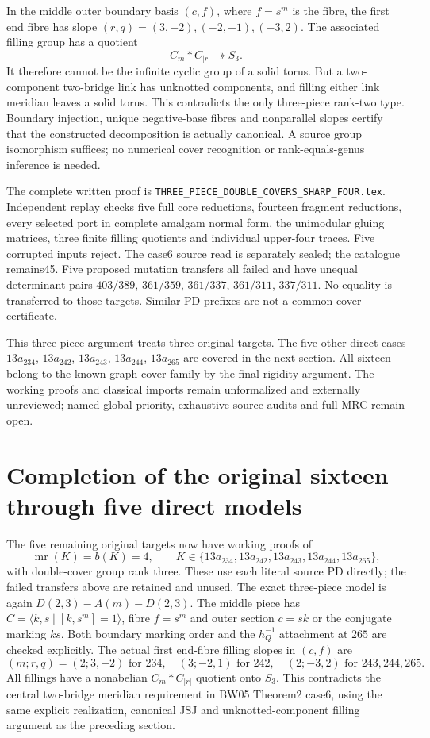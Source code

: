 \documentclass[11pt]{article}
\newcommand{\mr}{\operatorname{mr}}
\begin{document}
In the middle outer boundary basis $(c,f)$, where $f=s^m$ is the fibre,
the first end fibre has slope $(r,q)=(3,-2),(-2,-1),(-3,2)$.
The associated filling group has a quotient
\[
 C_m*C_{|r|}\twoheadrightarrow S_3.
\]
It therefore cannot be the infinite cyclic group of a solid torus.
But a two-component two-bridge link has unknotted components, and filling
either link meridian leaves a solid torus. This contradicts the only
three-piece rank-two type. Boundary injection, unique negative-base
fibres and nonparallel slopes certify that the constructed decomposition
is actually canonical. A source group isomorphism suffices; no numerical
cover recognition or rank-equals-genus inference is needed.

The complete written proof is
\texttt{THREE\_PIECE\_DOUBLE\_COVERS\_SHARP\_FOUR.tex}.
Independent replay checks five full core reductions, fourteen fragment
reductions, every selected port in complete amalgam normal form, the
unimodular gluing matrices, three finite filling quotients and individual
upper-four traces. Five corrupted inputs reject. The case6 source read
is separately sealed; the catalogue remains45.
Five proposed mutation transfers all failed and have unequal determinant
pairs $403/389$, $361/359$, $361/337$, $361/311$, $337/311$.
No equality is transferred to those targets. Similar PD prefixes are
not a common-cover certificate.

This three-piece argument treats three original targets. The five other
direct cases
$13a_{234}$, $13a_{242}$, $13a_{243}$, $13a_{244}$, $13a_{265}$ are covered in the next
section. All sixteen belong to the known graph-cover family by the final
rigidity argument. The working proofs and classical imports remain
unformalized and externally unreviewed; named global priority,
exhaustive source audits and full MRC remain open.

\section{Completion of the original sixteen through five direct models}

The five remaining original targets now have working proofs of
\[
 \mr(K)=b(K)=4,\qquad
 K\in\{13a_{234},13a_{242},13a_{243},13a_{244},13a_{265}\},
\]
with double-cover group rank three. These use each literal source PD
directly; the failed transfers above are retained and unused.
The exact three-piece model is again $D(2,3)-A(m)-D(2,3)$.
The middle piece has $C=\langle k,s\mid[k,s^m]=1\rangle$, fibre
$f=s^m$ and outer section $c=sk$ or the conjugate marking $ks$.
Both boundary marking order and the $h_Q^{-1}$ attachment at $265$
are checked explicitly. The actual first end-fibre filling slopes in
$(c,f)$ are
\[
 (m;r,q)=(2;3,-2)\text{ for }234,\quad
 (3;-2,1)\text{ for }242,\quad
 (2;-3,2)\text{ for }243,244,265.
\]
All fillings have a nonabelian $C_m*C_{|r|}$ quotient onto $S_3$.
This contradicts the central two-bridge meridian requirement in BW05
Theorem2 case6, using the same explicit realization, canonical JSJ and
unknotted-component filling argument as the preceding section.
\end{document}
